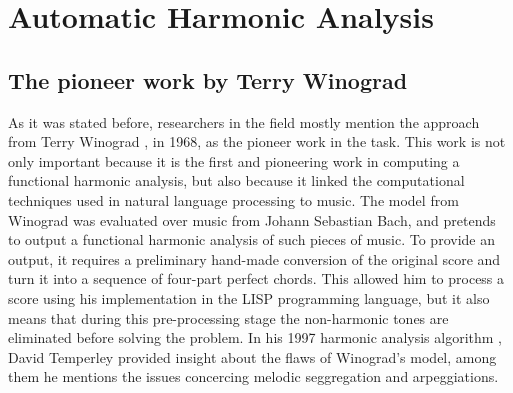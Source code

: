 

\section{Automatic Harmonic Analysis}
    \subsection{The pioneer work by Terry Winograd}
    As it was stated before, researchers in the field mostly mention the approach from Terry Winograd \cite{winograd1968linguistics}, in 1968, as the pioneer work in the task. This work is not only important because it is the first and pioneering work in computing a functional harmonic analysis, but also because it linked the computational techniques used in natural language processing to music. The model from Winograd was evaluated over music from Johann Sebastian Bach, and pretends to output a functional harmonic analysis of such pieces of music. To provide an output, it requires a preliminary hand-made conversion of the original score and turn it into a sequence of four-part perfect chords. This allowed him to process a score using his implementation in the LISP programming language, but it also means that during this pre-processing stage the non-harmonic tones are eliminated before solving the problem. In his 1997 harmonic analysis algorithm \cite{temperley1997algorithm}, David Temperley provided insight about the flaws of Winograd's model, among them he mentions the issues concercing melodic seggregation and arpeggiations.

